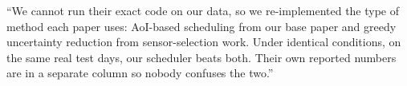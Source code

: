 \begin{saybox}
``We cannot run their exact code on our data, so we re-implemented the type of method each paper uses: AoI-based
scheduling from our base paper and greedy uncertainty reduction from sensor-selection work. Under identical conditions,
on the same real test days, our scheduler beats both. Their own reported numbers are in a separate column so nobody
confuses the two.''
\end{saybox}
